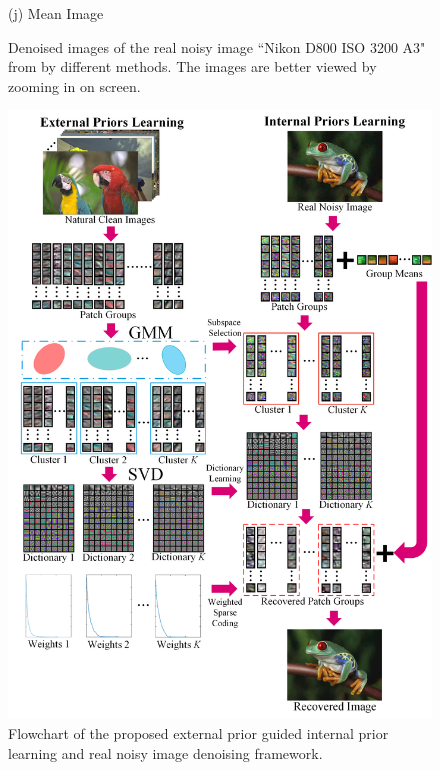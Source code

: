 \documentclass[10pt,twocolumn,letterpaper]{article}
\begin{document}
\begin{figure}
{\begin{minipage}[t]{0.195\textwidth}
{\footnotesize (j) Mean Image \cite{crosschannel2016} }
\end{minipage}
}\vspace{-1mm}
\caption{Denoised images of the real noisy image ``Nikon D800 ISO 3200 A3" from \cite{crosschannel2016} by different methods. The images are better viewed by zooming in on screen.} 
\vspace{-3mm}
\label{fig1}
\end{figure}

\begin{figure}\vspace{-0.1in}
\centering
\includegraphics[width=1\linewidth]{Flowchart.png}
\vspace{-0.25in}
\caption{Flowchart of the proposed external prior guided internal prior learning and real noisy image denoising framework.
}
\vspace{-0.2in}
\label{fig2}
\end{figure}
\end{document}
